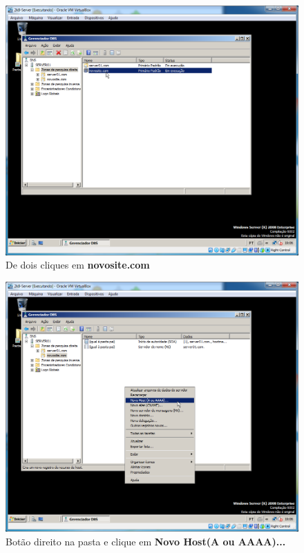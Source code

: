 \documentclass[10pt]{article}
\begin{document}
\begin{figure}[H]
    \centering
    \caption{De dois cliques em \textbf{novosite.com}}
    \label{fig:5532009}
    \includegraphics[width=\linewidth]{images/IIS/criando_um_novo_site/009.png}
\end{figure}
\begin{figure}[H]
    \centering
    \caption{Botão direito na pasta e clique em \textbf{Novo Host(A ou AAAA)...}}
    \label{fig:5532010}
    \includegraphics[width=\linewidth]{images/IIS/criando_um_novo_site/010.png}
\end{figure}
\end{document}
